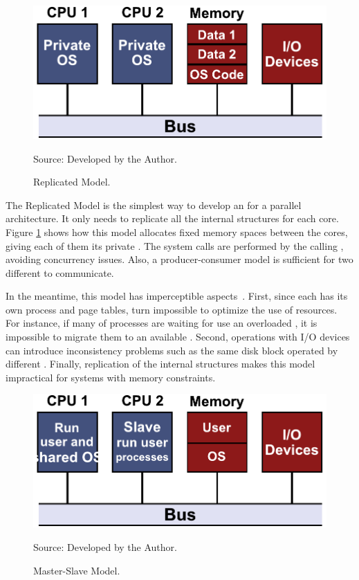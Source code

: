 			\begin{figure}[h]
				\centering
				\caption{Replicated \os Model.}

				\includegraphics[width=.7\textwidth]{images/replicated-os.pdf}

				Source: Developed by the Author.

				\label{fig.replicated-os}
			\end{figure}

			The Replicated Model is the simplest way to develop an \os for a
			parallel architecture.
			It only needs to replicate all the internal \os structures for each core.
			Figure \ref{fig.replicated-os} shows how this model allocates fixed memory spaces
			between the cores, giving each of them its private \os.
			The system calls are performed by the calling \cpu, avoiding concurrency issues.
			Also, a producer-consumer model is sufficient for two different \cpus to communicate.

			In the meantime, this model has imperceptible aspects~\cite{tanenbaum:4ed}.
			First, since each \cpu has its own process and page tables, turn impossible
			to optimize the use of resources.
			For instance, if many of processes are waiting for use an overloaded \cpu,
			it is impossible to migrate them to an available \cpu.
			Second, operations with I/O devices can introduce inconsistency problems
			such as the same disk block operated by different \cpus.
			Finally, replication of the internal \os structures makes this model
			impractical for systems with memory constraints.

			\begin{figure}[h]
				\centering
				\caption{Master-Slave \os Model.}
				
				\includegraphics[width=.7\textwidth]{images/master-slave-os.pdf}
				
				Source: Developed by the Author.

				\label{fig.master-slave-os}
			\end{figure}

